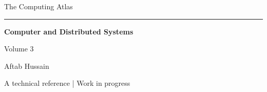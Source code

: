 \documentclass[11pt,oneside,openany]{book}
\begin{document}
\frontmatter
\begin{titlepage}
\centering
\vspace*{3.7cm}
{\Large The Computing Atlas\par}
\vspace{0.65cm}
\rule{0.6\textwidth}{0.5pt}\par
\vspace{0.75cm}
{\Huge\bfseries Computer and Distributed Systems\par}
\vspace{1.0cm}
{\large Volume 3\par}
\vfill
{\large Aftab Hussain\par}
\vspace{0.6cm}
{\small A technical reference | Work in progress\par}
\vspace{1.2cm}
\end{titlepage}
\tableofcontents
\mainmatter

\end{document}
